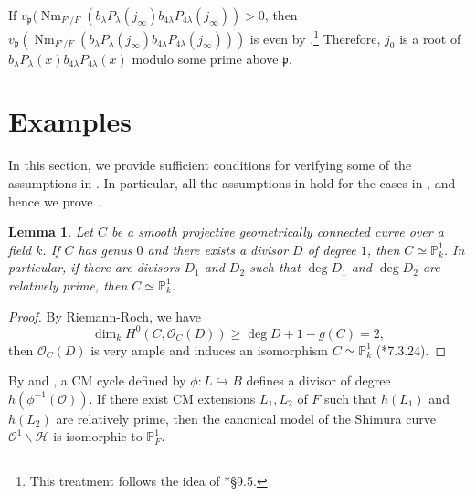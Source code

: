 \documentclass{amsart}
\numberwithin{equation}{subsection}
\numberwithin{theorem}{section}
\newtheorem{lemma}[theorem]{Lemma}
\theoremstyle{definition}
\theoremstyle{remark}
\newcommand{\bP}{\mathbb{P}}
\newcommand{\cH}{\mathcal{H}}
\newcommand{\cO}{\mathcal{O}}
\newcommand{\fp}{\mathfrak{p}}
\DeclareMathOperator{\Nm}{Nm}
\begin{document}
If $v_\fp(\Nm_{F'/F}(b_{\lambda}P_{\lambda}(j_\infty)b_{4\lambda}P_{4\lambda}(j_\infty))> 0$, then $v_\fp(\Nm_{F'/F}(b_{\lambda}P_{\lambda}(j_\infty)b_{4\lambda}P_{4\lambda}(j_\infty)))$ is even by .\footnote{This treatment follows the idea of \cite{LMPT}*{\S9.5}.} 
Therefore, $j_0$ is a root of $b_{\lambda}P_{\lambda}(x) b_{4\lambda}P_{4\lambda}(x)$ modulo some prime above $\fp$. 


\section{Examples}

In this section, we provide sufficient conditions for verifying some of the assumptions in . In particular, all the assumptions in  hold for the cases in , and hence we prove .

\begin{lemma}
    Let $C$ be a smooth projective geometrically connected curve over a field $k$. If $C$ has genus $0$ and there exists a divisor $D$ of degree $1$, then $C\simeq \bP^1_k$. In particular, if there are divisors $D_1$ and $D_2$ such that $\deg D_1$ and $\deg D_2$ are relatively prime, then $C\simeq \mathbb{P}^1_k$. 
\end{lemma}
\begin{proof}
    By Riemann-Roch, we have \[\dim_k H^0(C, \cO_C(D)) \geq \deg D + 1 - g(C) = 2, \] then $\cO_C(D)$ is very ample and induces an isomorphism $C\simeq \bP_k^1$ (\cite{MR1917232}*{7.3.24}). %
\end{proof}

By  and , a CM cycle defined by $\phi: L\hookrightarrow B$ defines a divisor of degree $h(\phi^{-1}(\cO))$. %
If there exist  CM extensions $L_1, L_2$ of $F$ such that $h(L_1)$ and $h(L_2)$ are relatively prime, then the canonical model of the Shimura curve $\cO^1\backslash\cH$ is isomorphic to $\bP^1_F$. 
\end{document}
